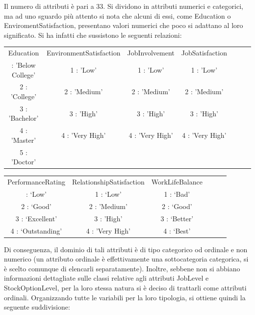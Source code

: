 \documentclass[a4paper,9pt]{article}
\begin{document}
Il numero di attributi è pari a 33. Si dividono in attributi numerici e categorici, ma ad uno sguardo più attento si nota che alcuni di essi, come Education o EnviromentSatisfaction, presentano valori numerici che poco si adattano al loro significato. Si ha infatti che sussistono le seguenti relazioni: 

\begin{center}
\begin{tabular}{|c|c|c|c|c|c|c|}
\arrayrulecolor{white}\hline
Education & EnvironmentSatisfaction & JobInvolvement & JobSatisfaction \\
\arrayrulecolor{white}\hline
1 : 'Below College' & 1 : 'Low'  & 1 : 'Low'& 1 : 'Low' \\
2 : 'College'  & 2 : 'Medium' & 2 : 'Medium'& 2 : 'Medium'\\
3 : 'Bachelor'    &3 : 'High' & 3 : 'High'& 3 : 'High'  \\
4 : 'Master'    &4 : 'Very High' & 4 : 'Very High' & 4 : 'Very High' \\
5 : 'Doctor'  &  & &\\
\hline
\end{tabular}
\end{center}


\begin{center}
\begin{tabular}{|c|c|c|c|c|c|}
\arrayrulecolor{white}\hline
PerformanceRating & RelationshipSatisfaction&WorkLifeBalance  &   \quad\quad&\quad\quad    &\quad\quad      \\
\arrayrulecolor{white}\hline
1 : `Low' & 1 : `Low' & 1 : `Bad'&&&\\
2 : `Good' & 2 : 'Medium'& 2 : `Good'&&&\\
3 : `Excellent'& 3 : 'High' & 3 : `Better'&&&\\
4 : `Outstanding'& 4 : 'Very High' &4 : `Best'&&&\\
\hline
\end{tabular}
\end{center}


Di conseguenza, il dominio di tali attributi è di tipo categorico od ordinale e non numerico (un attributo ordinale è effettivamente una sottocategoria categorica, si è scelto comunque di elencarli separatamente). Inoltre, sebbene non si abbiano informazioni dettagliate sulle classi relative agli attributi JobLevel e  StockOptionLevel, per la loro stessa natura si è deciso di trattarli come attributi ordinali. Organizzando tutte le variabili per la loro tipologia, si ottiene quindi la seguente suddivisione:
\end{document}
